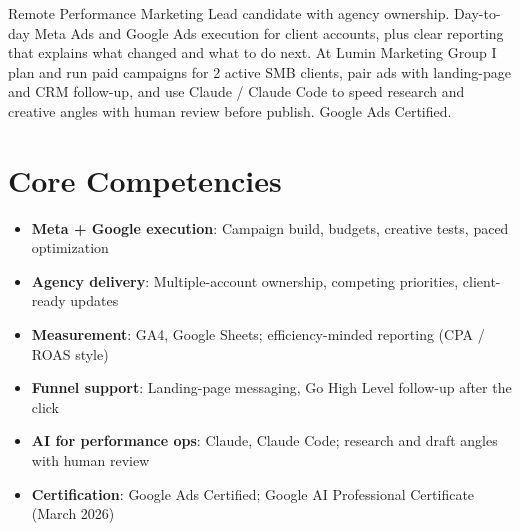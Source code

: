 \documentclass[11pt,a4paper,sans]{moderncv}
\begin{document}
\makecvtitle

\vspace{6pt}
\small{Remote Performance Marketing Lead candidate with agency ownership. Day-to-day Meta Ads and Google Ads execution for client accounts, plus clear reporting that explains what changed and what to do next. At Lumin Marketing Group I plan and run paid campaigns for 2 active SMB clients, pair ads with landing-page and CRM follow-up, and use Claude / Claude Code to speed research and creative angles with human review before publish. Google Ads Certified.}

\section{Core Competencies}
\vspace{1pt}
\begin{itemize}
\item \textbf{Meta + Google execution}: Campaign build, budgets, creative tests, paced optimization
\item \textbf{Agency delivery}: Multiple-account ownership, competing priorities, client-ready updates
\item \textbf{Measurement}: GA4, Google Sheets; efficiency-minded reporting (CPA / ROAS style)
\item \textbf{Funnel support}: Landing-page messaging, Go High Level follow-up after the click
\item \textbf{AI for performance ops}: Claude, Claude Code; research and draft angles with human review
\item \textbf{Certification}: Google Ads Certified; Google AI Professional Certificate (March 2026)
\end{itemize}
\end{document}
